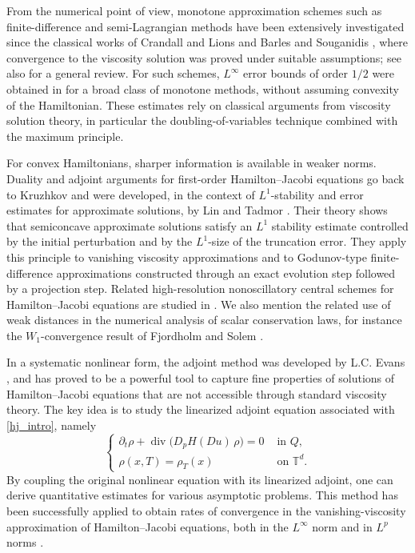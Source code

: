 \documentclass[11pt]{amsart}
\theoremstyle{remark}
\theoremstyle{definition}
\theoremstyle{Claim}
\theoremstyle{plain}
\begin{document}
From the numerical point of view, monotone approximation schemes such as finite-difference and semi-Lagrangian methods have been extensively investigated since the classical works of Crandall and Lions \cite{cl} and Barles and Souganidis \cite{bs}, where convergence to the viscosity solution was proved under suitable assumptions; see also \cite{ff} for a general review. For such schemes, \(L^\infty\) error bounds of order \(1/2\) were obtained in \cite{cl,cdi} for a broad class of monotone methods, without assuming convexity of the Hamiltonian. These estimates rely on classical arguments from viscosity solution theory, in particular the doubling-of-variables technique combined with the maximum principle.

For convex Hamiltonians, sharper information is available in weaker norms. Duality and adjoint arguments for first-order Hamilton--Jacobi equations go back to Kruzhkov \cite{kr} and were developed, in the context of \(L^1\)-stability and error estimates for approximate solutions, by Lin and Tadmor \cite{lt}. Their theory shows that semiconcave approximate solutions satisfy an \(L^1\) stability estimate controlled by the initial perturbation and by the \(L^1\)-size of the truncation error. They apply this principle to vanishing viscosity approximations and to Godunov-type finite-difference approximations constructed through an exact evolution step followed by a projection step. Related high-resolution nonoscillatory central schemes for Hamilton--Jacobi equations are studied in \cite{lt2}. We also mention the related use of weak distances in the numerical analysis of scalar conservation laws, for instance the \(W_1\)-convergence result of Fjordholm and Solem \cite{fs}.

In a systematic nonlinear form, the adjoint method was developed by L.C. Evans \cite{e}, and has proved to be a powerful tool to capture fine properties of solutions of Hamilton--Jacobi equations that are not accessible through standard viscosity theory. The key idea is to study the linearized adjoint equation associated with \eqref{hj_intro}, namely
\begin{equation}\label{adjoint_intro}
	\begin{cases}
		\partial_{t} \rho  + \operatorname{div} \big(D_pH(Du)\,\rho\big) = 0 & \text{ in } Q,\\[4pt]
		\rho(x,T) = \rho_T(x) & \text{ on } \mathbb{T}^d.
	\end{cases}
\end{equation}
By coupling the original nonlinear equation with its linearized adjoint, one can derive quantitative estimates for various asymptotic problems. This method has been successfully applied to obtain rates of convergence in the vanishing-viscosity approximation of Hamilton--Jacobi equations, both in the \(L^\infty\) norm \cite{e,t,cg,cd,go} and in \(L^p\) norms \cite{cgm}.
\end{document}
